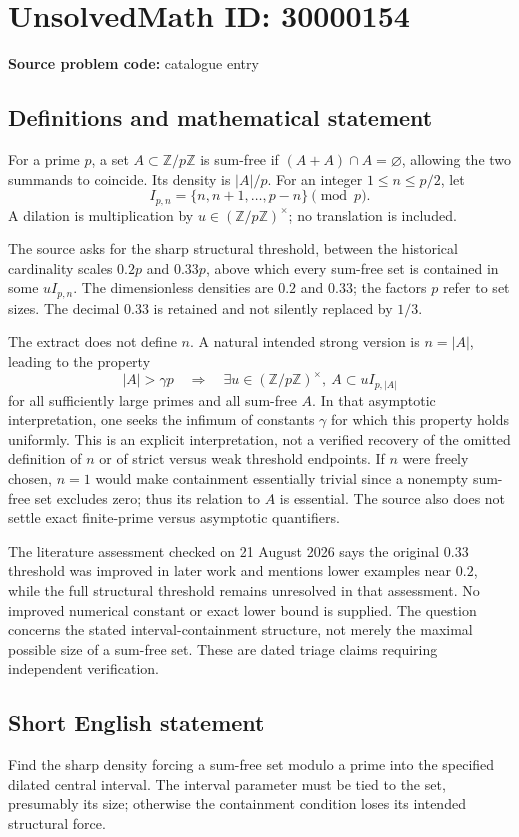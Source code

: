 \documentclass[11pt]{article}
\newcommand{\Z}{\mathbb{Z}}
\begin{document}
\section*{UnsolvedMath ID: 30000154}
\textbf{Source problem code:} catalogue entry
\subsection{Definitions and mathematical statement}
For a prime $p$, a set $A\subset\Z/p\Z$ is sum-free if $(A+A)\cap A=\varnothing$, allowing the two summands to coincide. Its density is $|A|/p$. For an integer $1\le n\le p/2$, let
\[
 I_{p,n}=\{n,n+1,\ldots,p-n\}\pmod p.
\]
A dilation is multiplication by $u\in(\Z/p\Z)^\times$; no translation is included.

The source asks for the sharp structural threshold, between the historical cardinality scales $0.2p$ and $0.33p$, above which every sum-free set is contained in some $uI_{p,n}$. The dimensionless densities are $0.2$ and $0.33$; the factors $p$ refer to set sizes. The decimal $0.33$ is retained and not silently replaced by $1/3$.

The extract does not define $n$. A natural intended strong version is $n=|A|$, leading to the property
\[
 |A|>\gamma p\quad\Longrightarrow\quad
 \exists u\in(\Z/p\Z)^\times,\ A\subset uI_{p,|A|}
\]
for all sufficiently large primes and all sum-free $A$. In that asymptotic interpretation, one seeks the infimum of constants $\gamma$ for which this property holds uniformly. This is an explicit interpretation, not a verified recovery of the omitted definition of $n$ or of strict versus weak threshold endpoints. If $n$ were freely chosen, $n=1$ would make containment essentially trivial since a nonempty sum-free set excludes zero; thus its relation to $A$ is essential. The source also does not settle exact finite-prime versus asymptotic quantifiers.

The literature assessment checked on 21 August 2026 says the original $0.33$ threshold was improved in later work and mentions lower examples near $0.2$, while the full structural threshold remains unresolved in that assessment. No improved numerical constant or exact lower bound is supplied. The question concerns the stated interval-containment structure, not merely the maximal possible size of a sum-free set. These are dated triage claims requiring independent verification.
\subsection{Short English statement}
Find the sharp density forcing a sum-free set modulo a prime into the specified dilated central interval. The interval parameter must be tied to the set, presumably its size; otherwise the containment condition loses its intended structural force.
\end{document}
